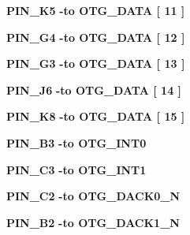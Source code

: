 \begin{DoxyCompactItemize}
{\bf P\+I\+N\+\_\+\+K5} {\bfseries \textcolor{vhdlchar}{-\/}\textcolor{keywordflow}{to}\textcolor{vhdlchar}{ }\textcolor{vhdlchar}{O\+T\+G\+\_\+\+D\+A\+TA}\textcolor{vhdlchar}{ }\textcolor{vhdlchar}{[}\textcolor{vhdlchar}{ } \textcolor{vhdldigit}{11} \textcolor{vhdlchar}{ }\textcolor{vhdlchar}{]}\textcolor{vhdlchar}{ }} 
\item 
{\bf P\+I\+N\+\_\+\+G4} {\bfseries \textcolor{vhdlchar}{-\/}\textcolor{keywordflow}{to}\textcolor{vhdlchar}{ }\textcolor{vhdlchar}{O\+T\+G\+\_\+\+D\+A\+TA}\textcolor{vhdlchar}{ }\textcolor{vhdlchar}{[}\textcolor{vhdlchar}{ } \textcolor{vhdldigit}{12} \textcolor{vhdlchar}{ }\textcolor{vhdlchar}{]}\textcolor{vhdlchar}{ }} 
\item 
{\bf P\+I\+N\+\_\+\+G3} {\bfseries \textcolor{vhdlchar}{-\/}\textcolor{keywordflow}{to}\textcolor{vhdlchar}{ }\textcolor{vhdlchar}{O\+T\+G\+\_\+\+D\+A\+TA}\textcolor{vhdlchar}{ }\textcolor{vhdlchar}{[}\textcolor{vhdlchar}{ } \textcolor{vhdldigit}{13} \textcolor{vhdlchar}{ }\textcolor{vhdlchar}{]}\textcolor{vhdlchar}{ }} 
\item 
{\bf P\+I\+N\+\_\+\+J6} {\bfseries \textcolor{vhdlchar}{-\/}\textcolor{keywordflow}{to}\textcolor{vhdlchar}{ }\textcolor{vhdlchar}{O\+T\+G\+\_\+\+D\+A\+TA}\textcolor{vhdlchar}{ }\textcolor{vhdlchar}{[}\textcolor{vhdlchar}{ } \textcolor{vhdldigit}{14} \textcolor{vhdlchar}{ }\textcolor{vhdlchar}{]}\textcolor{vhdlchar}{ }} 
\item 
{\bf P\+I\+N\+\_\+\+K8} {\bfseries \textcolor{vhdlchar}{-\/}\textcolor{keywordflow}{to}\textcolor{vhdlchar}{ }\textcolor{vhdlchar}{O\+T\+G\+\_\+\+D\+A\+TA}\textcolor{vhdlchar}{ }\textcolor{vhdlchar}{[}\textcolor{vhdlchar}{ } \textcolor{vhdldigit}{15} \textcolor{vhdlchar}{ }\textcolor{vhdlchar}{]}\textcolor{vhdlchar}{ }} 
\item 
{\bf P\+I\+N\+\_\+\+B3} {\bfseries \textcolor{vhdlchar}{-\/}\textcolor{keywordflow}{to}\textcolor{vhdlchar}{ }\textcolor{vhdlchar}{O\+T\+G\+\_\+\+I\+N\+T0}\textcolor{vhdlchar}{ }} 
\item 
{\bf P\+I\+N\+\_\+\+C3} {\bfseries \textcolor{vhdlchar}{-\/}\textcolor{keywordflow}{to}\textcolor{vhdlchar}{ }\textcolor{vhdlchar}{O\+T\+G\+\_\+\+I\+N\+T1}\textcolor{vhdlchar}{ }} 
\item 
{\bf P\+I\+N\+\_\+\+C2} {\bfseries \textcolor{vhdlchar}{-\/}\textcolor{keywordflow}{to}\textcolor{vhdlchar}{ }\textcolor{vhdlchar}{O\+T\+G\+\_\+\+D\+A\+C\+K0\+\_\+N}\textcolor{vhdlchar}{ }} 
\item 
{\bf P\+I\+N\+\_\+\+B2} {\bfseries \textcolor{vhdlchar}{-\/}\textcolor{keywordflow}{to}\textcolor{vhdlchar}{ }\textcolor{vhdlchar}{O\+T\+G\+\_\+\+D\+A\+C\+K1\+\_\+N}\textcolor{vhdlchar}{ }} 

\end{DoxyCompactItemize}
